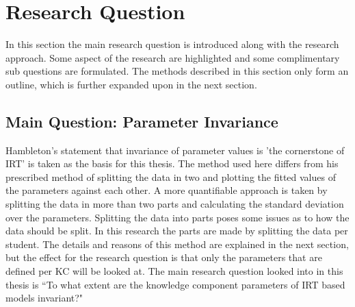\documentclass{scrartcl}
\begin{document}

\section{Research Question}
\label{sec:RQ}
In this section the main research question is introduced along with the research approach. Some aspect of the research are highlighted and some complimentary sub questions are formulated. The methods described in this section only form an outline, which is further expanded upon in the next section.

\subsection{Main Question: Parameter Invariance}
Hambleton's statement that invariance of parameter values is 'the cornerstone of IRT' is taken as the basis for this thesis. The method used here differs from his prescribed method of splitting the data in two and plotting the fitted values of the parameters against each other. A more quantifiable approach is taken by splitting the data in more than two parts and calculating the standard deviation over the parameters. Splitting the data into parts poses some issues as to how the data should be split. In this research the parts are made by splitting the data per student. The details and reasons of this method are explained in the next section, but the effect for the research question is that only the parameters that are defined per KC will be looked at. The main research question looked into in this thesis is ``To what extent are the knowledge component parameters of IRT based models invariant?"
\end{document}

